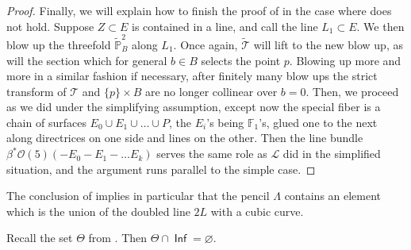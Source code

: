 \documentclass{article}
\renewcommand{\P}{\mathbb{P}}
\renewcommand{\O}{\mathcal{O}}
\DeclareMathOperator{\Inf}{\mathsf{Inf}}
\begin{document}
\begin{proof}
Finally, we will explain how to finish the proof of  in the case where  does not hold. Suppose $Z \subset E$ is contained in a line, and call the line $L_1 \subset E$.  We then blow up the threefold $\widetilde{\P}^{2}_{B}$ along $L_1$.  Once again, $\widetilde{\mathcal{T}}$ will lift to the new blow up, as will the section which for general $b \in B$ selects the point $p$. Blowing up more and more in a similar fashion if necessary, after finitely many blow ups the strict transform of $\mathcal{T}$ and $\{p\} \times B$ are no longer collinear over $b=0$.  Then, we proceed as we did under the simplifying assumption, except now the special fiber is a chain of surfaces $E_0 \cup E_{1} \cup \dots \cup P$, the $E_{i}$'s being $\mathbb{F}_{1}$'s, glued one to the next along directrices on one side and lines on the other.  Then the line bundle $\beta^{*}\O(5)(-E_{0}-E_{1}-\dots E_{k})$ serves the same role as $\mathcal{L}$ did in the simplified situation, and the argument runs parallel to the simple case. 
\end{proof}

\begin{remark}
\label{remark:splitline}
    The conclusion of  implies in particular that the pencil $\Lambda$ contains an element which is the union of the doubled line $2L$ with a cubic curve.
\end{remark}




\begin{proposition}
    \label{lemma:ThetaInf} Recall the set $\Theta$ from . Then $\Theta \cap \Inf = \varnothing.$
\end{proposition}
\end{document}

